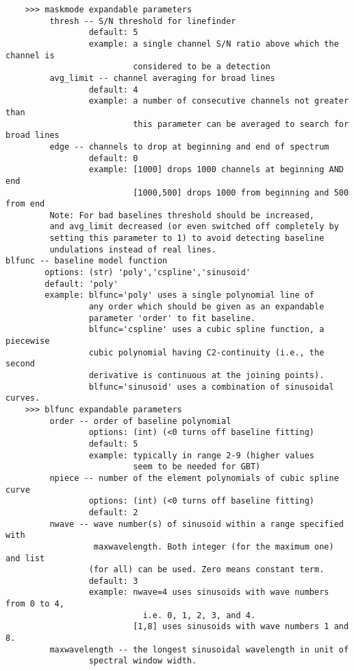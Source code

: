 \begin{verbatim}
    >>> maskmode expandable parameters
         thresh -- S/N threshold for linefinder
                 default: 5
                 example: a single channel S/N ratio above which the channel is
                          considered to be a detection
         avg_limit -- channel averaging for broad lines
                 default: 4
                 example: a number of consecutive channels not greater than
                          this parameter can be averaged to search for broad lines
         edge -- channels to drop at beginning and end of spectrum
                 default: 0
                 example: [1000] drops 1000 channels at beginning AND end
                          [1000,500] drops 1000 from beginning and 500 from end
         Note: For bad baselines threshold should be increased,
         and avg_limit decreased (or even switched off completely by
         setting this parameter to 1) to avoid detecting baseline
         undulations instead of real lines.
blfunc -- baseline model function
        options: (str) 'poly','cspline','sinusoid'
        default: 'poly'
        example: blfunc='poly' uses a single polynomial line of 
                 any order which should be given as an expandable 
                 parameter 'order' to fit baseline. 
                 blfunc='cspline' uses a cubic spline function, a piecewise 
                 cubic polynomial having C2-continuity (i.e., the second 
                 derivative is continuous at the joining points). 
                 blfunc='sinusoid' uses a combination of sinusoidal curves. 
    >>> blfunc expandable parameters
         order -- order of baseline polynomial
                 options: (int) (<0 turns off baseline fitting)
                 default: 5
                 example: typically in range 2-9 (higher values
                          seem to be needed for GBT)
         npiece -- number of the element polynomials of cubic spline curve
                 options: (int) (<0 turns off baseline fitting)
                 default: 2
         nwave -- wave number(s) of sinusoid within a range specified with
                  maxwavelength. Both integer (for the maximum one) and list 
                 (for all) can be used. Zero means constant term. 
                 default: 3
                 example: nwave=4 uses sinusoids with wave numbers from 0 to 4,
                            i.e. 0, 1, 2, 3, and 4.
                          [1,8] uses sinusoids with wave numbers 1 and 8.
         maxwavelength -- the longest sinusoidal wavelength in unit of 
                 spectral window width.

\end{verbatim}
